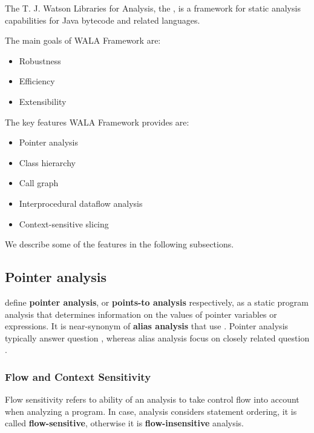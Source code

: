 The T. J. Watson Libraries for Analysis, the \citet{WalaFramework},
is a framework for static analysis capabilities for Java
bytecode and related languages.

The main goals of WALA Framework are:
\begin{itemize}
  \item Robustness
  \item Efficiency
  \item Extensibility
\end{itemize}

The key features WALA Framework provides are:
\begin{itemize}
  \item Pointer analysis
  \item Class hierarchy
  \item Call graph
  \item Interprocedural dataflow analysis
  \item Context-sensitive slicing
\end{itemize}

We describe some of the features in the following subsections.



\subsection{Pointer analysis}

\citet{PointerAnalysis} define \textbf{pointer analysis},
or \textbf{points-to analysis} respectively, as a static program analysis that
determines information on the values of pointer variables or expressions.
It is near-synonym of \textbf{alias analysis} that use \citet{AliasAnalysis}.
Pointer analysis typically answer question
,
whereas alias analysis focus on closely related question
.




\subsubsection{Flow and Context Sensitivity}

Flow sensitivity refers to ability of an analysis to take control flow
into account when analyzing a program.
In case, analysis considers statement ordering, it is called \textbf{flow-sensitive},
otherwise it is \textbf{flow-insensitive} analysis.


